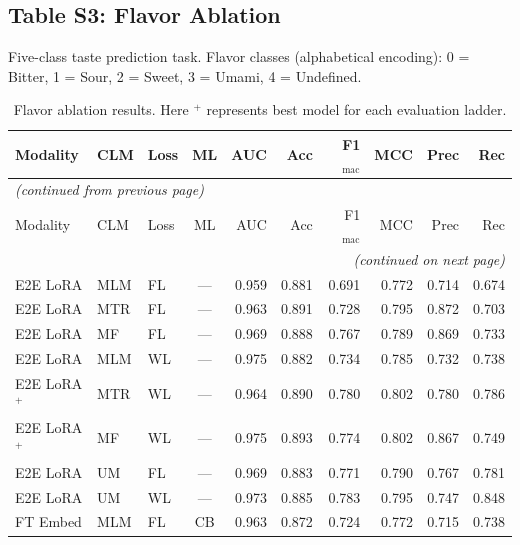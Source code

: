 \documentclass[9pt,a4paper]{article}
\begin{document}
\newpage

\subsection*{Table S3: Flavor Ablation}

Five-class taste prediction task.
Flavor classes (alphabetical encoding): 0 = Bitter, 1 = Sour, 2 = Sweet, 3 = Umami,
4 = Undefined. 

\begin{scriptsize}
\begin{longtable}{lllcrrrrrr}
\caption{Flavor ablation results. Here $^{+}$ represents best model for each evaluation ladder.}
\label{tab:s3_flavor} \\
\toprule
Modality & CLM & Loss & ML & AUC & Acc & F1$_\text{mac}$ & MCC & Prec & Rec \\
\midrule
\endfirsthead
\multicolumn{10}{l}{\footnotesize\textit{(continued from previous page)}} \\
\toprule
Modality & CLM & Loss & ML & AUC & Acc & F1$_\text{mac}$ & MCC & Prec & Rec \\
\midrule
\endhead
\midrule
\multicolumn{10}{r}{\footnotesize\textit{(continued on next page)}} \\
\endfoot
\bottomrule
\endlastfoot
E2E LoRA & MLM & FL & --- & 0.959 & 0.881 & 0.691 & 0.772 & 0.714 & 0.674 \\
E2E LoRA & MTR & FL & --- & 0.963 & 0.891 & 0.728 & 0.795 & 0.872 & 0.703 \\
E2E LoRA & MF  & FL & --- & 0.969 & 0.888 & 0.767 & 0.789 & 0.869 & 0.733 \\
E2E LoRA & MLM & WL & --- & 0.975 & 0.882 & 0.734 & 0.785 & 0.732 & 0.738 \\
E2E LoRA$^+$ & MTR & WL & --- & 0.964 & 0.890 & 0.780 & 0.802 & 0.780 & 0.786 \\
E2E LoRA$^+$ & MF  & WL & --- & 0.975 & 0.893 & 0.774 & 0.802 & 0.867 & 0.749 \\
E2E LoRA & UM  & FL & --- & 0.969 & 0.883 & 0.771 & 0.790 & 0.767 & 0.781 \\
E2E LoRA & UM  & WL & --- & 0.973 & 0.885 & 0.783 & 0.795 & 0.747 & 0.848 \\
\midrule
FT Embed & MLM & FL & CB  & 0.963 & 0.872 & 0.724 & 0.772 & 0.715 & 0.738 \\

\end{longtable}
\end{scriptsize}
\end{document}
